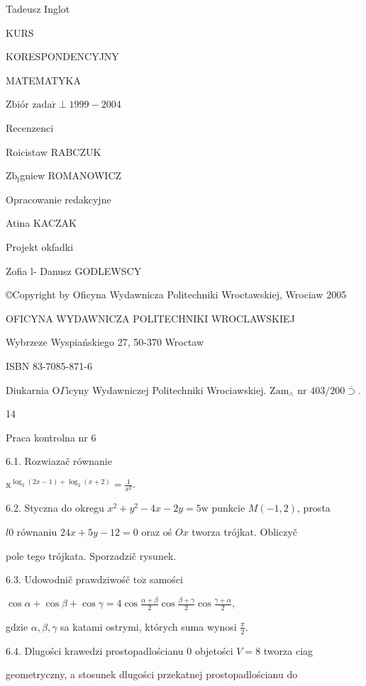 \documentclass[a4paper,12pt]{article}
\begin{document}
Tadeusz Inglot

KURS

KORESPONDENCYJNY

MATEMATYKA

Zbiór $\mathrm{z}\mathrm{a}\mathrm{d}\mathrm{a}\acute{\mathrm{r}}\perp 1999-2004$




Recenzenci

Roicistaw RABCZUK

$\mathrm{Z}\mathrm{b}_{\mathrm{f}}$gniew ROMANOWICZ

Opracowanie redakcyjne

Atina KACZAK

Projekt okfadki

Zofia l- Danusz GODLEWSCY

\copyright Copyright by Oficyna Wydawnicza Politechniki Wroctawskiej, Wrociaw 2005

OFICYNA WYDAWNICZA POLITECHNIKI WROCLAWSKIEJ

Wybrzeze Wyspiańskiego 27, 50-370 Wroctaw

ISBN 83-7085-871-6

Diukarnia $\mathrm{O}\Gamma$icyny Wydawniczej Politechniki Wrociawskiej. $\mathrm{Z}\mathrm{a}\mathrm{m}_{\wedge}$ nr $403/200\overline{\supset}.$





14

Praca kontrolna nr 6

6.1. Rozwiazač równanie

$\displaystyle \mathrm{x}^{\log_{2}(2x-1)+\log_{2}(x+2)}=\frac{1}{x^{2}}.$

6.2. Styczna do okregu $x^{2}+y^{2}-4x-2y=5\mathrm{w}$ punkcie $M(-1,2)$, prosta

$l0$ równaniu $24x+5y-12=0$ oraz oś $Ox$ tworza trójkat. Obliczyč

pole tego trójkata. Sporzadzič rysunek.

6.3. Udowodnič prawdziwośč $\mathrm{t}\mathrm{o}\dot{\mathrm{z}}$ samości

$\displaystyle \cos\alpha+\cos\beta+\cos\gamma=4\cos\frac{\alpha+\beta}{2}\cos\frac{\beta+\gamma}{2}\cos\frac{\gamma+\alpha}{2},$

gdzie $\alpha, \beta, \gamma$ sa katami ostrymi, których suma wynosi $\displaystyle \frac{\pi}{2}.$

6.4. Dlugości krawedzi prostopadlościanu $0$ objetości $V = 8$ tworza ciag

geometryczny, a stosunek dlugości przekatnej prostopadlościanu do
\end{document}
